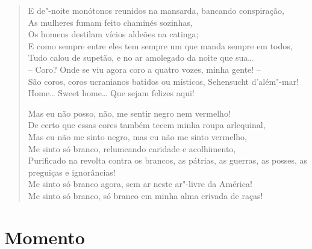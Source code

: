 \begin{verse}
E de"-noite monótonos reunidos na mansarda, bancando conspiração,\\
As mulheres fumam feito chaminés sozinhas,\\
Os homens destilam vícios aldeões na catinga;\\
E como sempre entre eles tem sempre um que manda sempre em todos,\\
Tudo calou de supetão, e no ar amolegado da noite que sua\ldots{}\\
-- Coro? Onde se viu agora coro a quatro vozes, minha gente! --\\
São coros, coros ucranianos batidos ou místicos, Sehensucht d'além"-mar!\\
Home\ldots{} Sweet home\ldots{} Que sejam felizes aqui!

Mas eu não posso, não, me sentir negro nem vermelho!\\
De certo que essas cores também tecem minha roupa arlequinal,\\
Mas eu não me sinto negro, mas eu não me sinto vermelho,\\
Me sinto só branco, relumeando caridade e acolhimento,\\
Purificado na revolta contra os brancos, as pátrias, as guerras, as posses, as
preguiças e ignorâncias!\\
Me sinto só branco agora, sem ar neste ar"-livre da América!\\
Me sinto só branco, só branco em minha alma crivada de raças!
\end{verse}

\chapter[Momento]{Momento }

